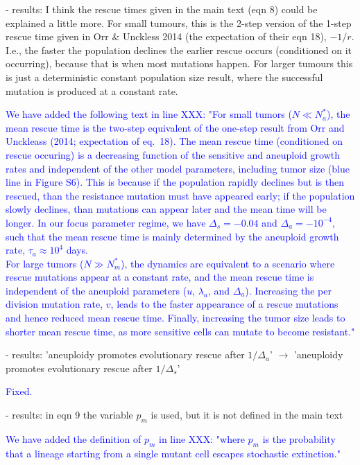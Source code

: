 \documentclass[12pt]{extarticle}
\begin{document}
- results: I think the rescue times given in the main text (eqn 8) could be explained a little more. For small tumours, this is the 2-step version of the 1-step rescue time given in Orr $\&$ Unckless 2014 (the expectation of their eqn 18), $-1/r$. I.e., the faster the population declines the earlier rescue occurs (conditioned on it occurring), because that is when most mutations happen. For larger tumours this is just a deterministic constant population size result, where the successful mutation is produced at a constant rate.

\textcolor{blue}{%
We have added the following text in line XXX: "For small tumors ($ N \ll N_a^*$), the mean rescue time is the two-step equivalent of the one-step result from Orr and Unckleass (2014; expectation of eq.~18). The mean rescue time (conditioned on rescue occuring) is a decreasing function of the sensitive and aneuploid growth rates and independent of the other model parameters, including tumor size (blue line in Figure S6). This is because if the population rapidly declines but is then rescued, than the resistance mutation must have appeared early; if the population slowly declines, than mutations can appear later and the mean time will be longer. In our focus parameter regime, we have $\Delta_s=-0.04$ and $\Delta_a=-10^{-4}$, such that the mean rescue time is mainly determined by the aneuploid growth rate, $\tau_a \approx 10^4$ days. 
\\
For large tumors ($N \gg N_m^*$), the dynamics are equivalent to a scenario where rescue mutations appear at a constant rate, and the mean rescue time is independent of the aneuploid parameters ($u$, $\lambda_a$, and $\Delta_a$). Increasing the per division mutation rate, $v$, leads to the faster appearance of a rescue mutations and hence reduced mean rescue time. Finally, increasing the tumor size leads to shorter mean rescue time, as more sensitive cells can mutate to become resistant."
}

- results: 'aneuploidy promotes evolutionary rescue after $1/\Delta_a$' $\rightarrow$ 'aneuploidy promotes evolutionary rescue after $1/\Delta_s$'

\textcolor{blue}{Fixed.} %

- results: in eqn 9 the variable $p_m$ is used, but it is not defined in the main text

\textcolor{blue}{%
We have added the definition of $p_m$ in line XXX: "where $p_m$ is the probability that a lineage starting from a single mutant cell escapes stochastic extinction."
} 
\end{document}

